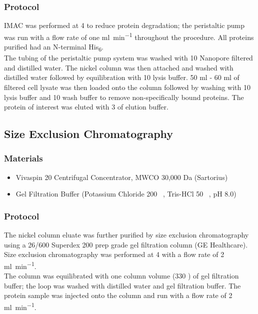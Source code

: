 			\subsubsection{Protocol}
			IMAC was performed at 4 \degrees to reduce protein degradation; the peristaltic pump was run with a flow rate of one \si{\milli\litre\per\minute} throughout the procedure. All proteins purified had an N-terminal His\textsubscript{6}.\\
			The tubing of the peristaltic pump system was washed with 10 \ml Nanopore filtered and distilled water. The nickel column was then attached and washed with distilled water followed by equilibration with 10 \ml lysis buffer. 50 \si{\milli\litre} - 60 \si{\milli\litre} of filtered cell lysate was then loaded onto the column followed by washing with 10 \ml lysis buffer and 10 \ml wash buffer to remove non-specifically bound proteins. The protein of interest was eluted with 3 \ml of elution buffer. \newpage
			
			
		\subsection*{Size Exclusion Chromatography}
		\label{sec:SEC_Methods}
\subsubsection{Materials}
				\begin{itemize}
				\item Vivaspin 20 Centrifugal Concentrator, MWCO 30,000 Da (Sartorius)
				\item Gel Filtration Buffer (Potassium Chloride 200 \si{\milli\molar}, Tris-HCl 50 \si{\milli\molar}, pH 8.0) 
				\end{itemize}
			\subsubsection{Protocol}
			The nickel column eluate was further purified by size exclusion chromatography using a 26/600 Superdex 200 prep grade gel filtration column (GE Healthcare). Size exclusion chromatography was performed at 4 \degrees with a flow rate of 2 \si{\milli\litre\per\minute}.\\
			The column was equilibrated with one column volume (330 \ml) of gel filtration buffer; the loop was washed with distilled water and gel filtration buffer. The protein sample was injected onto the column and run with a flow rate of 2 \si{\milli\litre\per\minute}. 

